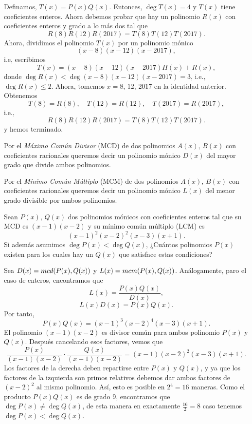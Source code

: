 \begin{solution}
    Definamos, $T(x)=P(x)Q(x)$.
    Entonces, $\deg T(x) = 4$ y $T(x)$ tiene coeficientes enteros.
    Ahora debemos probar que hay un polinomio $R(x)$ con coeficientes enteros y grado a lo más dos tal que
    \[
        R(8)R(12)R(2017)=T(8)T(12)T(2017).
    \]
    Ahora, dividimos el polinomio $T(x)$ por un polinomio mónico
    \[
        (x-8)(x-12)(x-2017),
    \]
    i.e, escribimos
    \[
        T(x)=(x-8)(x-12)(x-2017)H(x)+R(x),
    \]
    donde $\deg R(x) < \deg (x-8)(x-12)(x-2017)=3$, i.e., $\deg R(x) \leq 2$.
    Ahora, tomemos $x=8$, $12$, $2017$ en la identidad anterior.
    Obtenemos
    \[
        T(8)=R(8),\quad T(12)=R(12),\quad T(2017)=R(2017),
    \]
    i.e.,
    \[
        R(8)R(12)R(2017)=T(8)T(12)T(2017).
    \]
    y hemos terminado.
\end{solution}

Por el \textit{Máximo Común Divisor} (MCD) de dos polinomios $A(x)$, $B(x)$ con coeficientes racionales queremos decir un polinomio mónico $D(x)$ del mayor grado que divide ambos polinomios.

Por el \textit{Mínimo Común Múltiplo} (MCM) de dos polinomios $A(x)$, $B(x)$ con coeficientes racionales queremos decir un polinomio mónico $L(x)$ del menor grado divisible por ambos polinomios.

\begin{example}
    Sean $P(x)$, $Q(x)$ dos polinomios mónicos con coeficientes enteros tal que su MCD es $(x - 1)(x - 2)$ y su mínimo común múltiplo (LCM) es
    \[
        (x - 1)^2 (x - 2)^2 (x - 3)(x + 1).
    \]
    Si además asumimos $\deg P(x) < \deg Q(x)$, ¿Cuántos polinomios $P(x)$ existen para los cuales hay un $Q(x)$ que satisface estas condiciones?
\end{example}

\begin{solution}
    Sea $D(x) = mcd(P(x), Q(x))$ y $L(x) = mcm(P(x), Q(x))$.
    Análogamente, paro el caso de enteros, encontramos que
    \[
        L(x) = \frac{P(x) Q(x)}{D(x)},
    \]
    \ie
    \[
        L(x) D(x) = P(x) Q(x).
    \]
    Por tanto,
    \[
        P(x) Q(x) = (x - 1)^3 (x - 2)^4 (x - 3) (x + 1).
    \]
    El polinomio $(x - 1)(x - 2)$ es divisor común para ambos polinomio $P(x)$ y $Q(x)$.
    Después cancelando esos factores, vemos que
    \[
        \frac{P(x)}{(x - 1)(x - 2)} \cdot \frac{Q(x)}{(x - 1)(x - 2)} = (x - 1)(x - 2)^2 (x - 3)(x + 1).
    \]
    Los factores de la derecha deben repartirse entre $P(x)$ y $Q(x)$, y ya que los factores de la izquierda son primos relativos debemos dar ambos factores de $(x - 2)^2$ al mismo polinomio.
    Así, esto es posible en $2^4 = 16$ maneras.
    Como el producto $P(x) Q(x)$ es de grado 9, encontramos que $\deg{P(x)} \neq \deg{Q(x)}$, de esta manera en exactamente $\frac{16}{2} = 8$ caso tenemos $\deg{P(x)} < \deg{Q(x)}$.
\end{solution}



